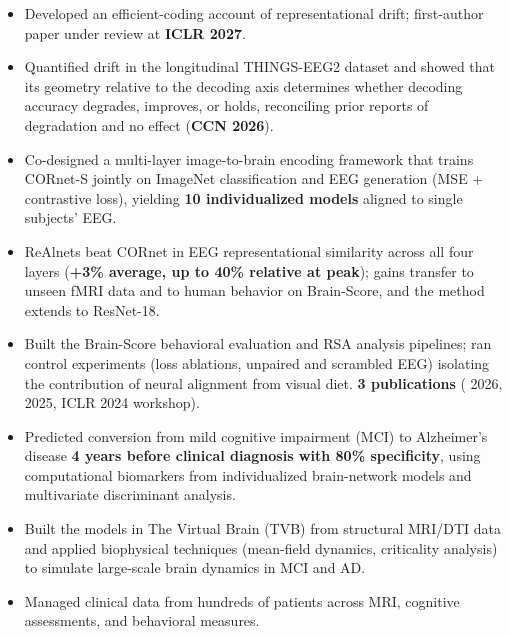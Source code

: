 \begin{itemize}
  \item Developed an efficient-coding account of representational drift; first-author paper under review at \textbf{ICLR 2027}.
  \item Quantified drift in the longitudinal THINGS-EEG2 dataset and showed that its geometry relative to the decoding axis determines whether decoding accuracy degrades, improves, or holds, reconciling prior reports of degradation and no effect (\textbf{CCN 2026}).
\end{itemize}
\begin{itemize}
  \item Co-designed a multi-layer image-to-brain encoding framework that trains CORnet-S jointly on ImageNet classification and EEG generation (MSE + contrastive loss), yielding \textbf{10 individualized models} aligned to single subjects' EEG.
  \item ReAlnets beat CORnet in EEG representational similarity across all four layers (\textbf{+3\% average, up to 40\% relative at peak}); gains transfer to unseen fMRI data and to human behavior on Brain-Score, and the method extends to ResNet-18.
  \item Built the Brain-Score behavioral evaluation and RSA analysis pipelines; ran control experiments (loss ablations, unpaired and scrambled EEG) isolating the contribution of neural alignment from visual diet. \textbf{3 publications} ( 2026,  2025, ICLR 2024 workshop).
\end{itemize}
\begin{itemize}
  \item Predicted conversion from mild cognitive impairment (MCI) to Alzheimer's disease \textbf{4 years before clinical diagnosis with 80\% specificity}, using computational biomarkers from individualized brain-network models and multivariate discriminant analysis.
  \item Built the models in The Virtual Brain (TVB) from structural MRI/DTI data and applied biophysical techniques (mean-field dynamics, criticality analysis) to simulate large-scale brain dynamics in MCI and AD.
  \item Managed clinical data from hundreds of patients across MRI, cognitive assessments, and behavioral measures.
\end{itemize}
